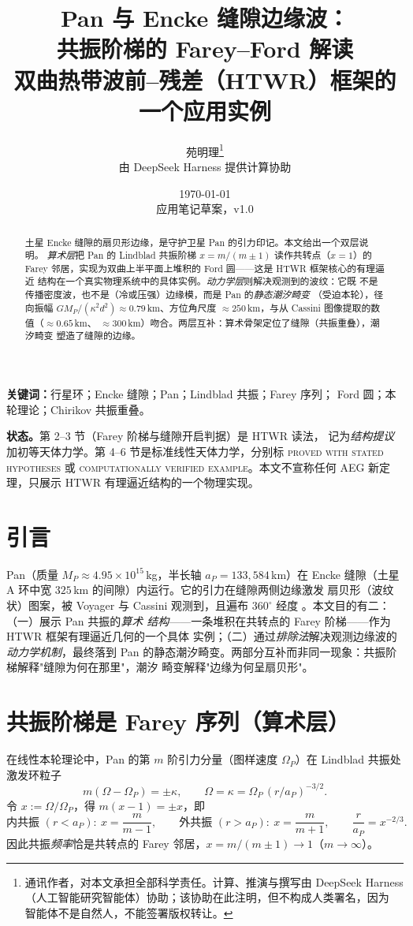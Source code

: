 \documentclass[11pt]{ctexart}
\title{\textbf{Pan 与 Encke 缝隙边缘波：\\[0.3em]
共振阶梯的 Farey--Ford 解读}\\[0.35em]
\large 双曲热带波前--残差（HTWR）框架的一个应用实例}
\author{
苑明理\thanks{通讯作者，对本文承担全部科学责任。计算、推演与撰写由 DeepSeek
Harness（人工智能研究智能体）协助；该协助在此注明，但不构成人类署名，因为
智能体不是自然人，不能签署版权转让。}\\
\small 由 DeepSeek Harness 提供计算协助
}
\date{\today\\[0.25em]\small 应用笔记草案，v1.0}
\theoremstyle{remark}
\begin{document}
\maketitle

\begin{abstract}
土星 Encke 缝隙的扇贝形边缘，是守护卫星 Pan 的引力印记。本文给出一个双层说明。
\emph{算术层}把 Pan 的 Lindblad 共振阶梯 $x=m/(m\pm1)$ 读作共转点（$x=1$）的
Farey 邻居，实现为双曲上半平面上堆积的 Ford 圆——这是 HTWR 框架核心的有理逼近
结构在一个真实物理系统中的具体实例。\emph{动力学层}则解决观测到的波纹：它既
不是传播密度波，也不是（冷或压强）边缘模，而是 Pan 的\emph{静态潮汐畸变}
（受迫本轮），径向振幅 $GM_P/(\kappa^2 d^2)\approx0.79$\,km、方位角尺度
$\approx250$\,km，与从 Cassini 图像提取的数值（$\approx0.65$\,km、
$\approx300$\,km）吻合。两层互补：算术骨架定位了缝隙（共振重叠），潮汐畸变
塑造了缝隙的边缘。
\end{abstract}

\noindent\textbf{关键词：}行星环；Encke 缝隙；Pan；Lindblad 共振；Farey 序列；
Ford 圆；本轮理论；Chirikov 共振重叠。

\noindent\textbf{状态。}第 2--3 节（Farey 阶梯与缝隙开启判据）是 HTWR 读法，
记为\emph{结构提议}加初等天体力学。第 4--6 节是标准线性天体力学，分别标
\textsc{proved with stated hypotheses} 或 \textsc{computationally verified
example}。本文不宣称任何 AEG 新定理，只展示 HTWR 有理逼近结构的一个物理实现。

\section{引言}\label{sec:intro}

Pan（质量 $M_P\approx4.95\times10^{15}$\,kg，半长轴 $a_P=133{,}584$\,km）在
Encke 缝隙（土星 A 环中宽 $325$\,km 的间隙）内运行。它的引力在缝隙两侧边缘激发
扇贝形（波纹状）图案，被 Voyager 与 Cassini 观测到，且遍布 $360^\circ$ 经度
\cite{Tiscareno2005WavyEdges}。本文目的有二：（一）展示 Pan 共振的\emph{算术
结构}——一条堆积在共转点的 Farey 阶梯——作为 HTWR 框架有理逼近几何的一个具体
实例；（二）通过\emph{排除法}解决观测边缘波的\emph{动力学机制}，最终落到 Pan
的静态潮汐畸变。两部分互补而非同一现象：共振阶梯解释"缝隙为何在那里"，潮汐
畸变解释"边缘为何呈扇贝形"。

\section{共振阶梯是 Farey 序列（算术层）}\label{sec:farey}

在线性本轮理论中，Pan 的第 $m$ 阶引力分量（图样速度 $\Omega_P$）在 Lindblad
共振处激发环粒子
\begin{equation}\label{eq:lindblad}
m(\Omega-\Omega_P)=\pm\kappa,\qquad
\Omega=\kappa=\Omega_P\,(r/a_P)^{-3/2}.
\end{equation}
令 $x:=\Omega/\Omega_P$，得 $m(x-1)=\pm x$，即
\begin{equation}\label{eq:ladder}
\text{内共振 }(r<a_P):\ x=\frac{m}{m-1},\qquad
\text{外共振 }(r>a_P):\ x=\frac{m}{m+1},\qquad
\frac{r}{a_P}=x^{-2/3}.
\end{equation}
因此共振\emph{频率}恰是共转点的 Farey 邻居，$x=m/(m\pm1)\to1$（$m\to\infty$）。
\end{document}
